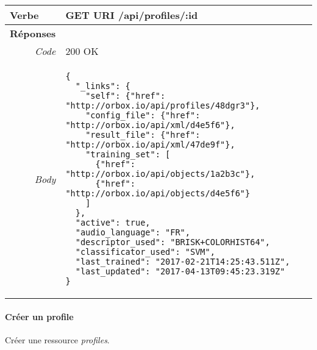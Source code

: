 \begin{appendices}
\begin{absolutelynopagebreak}
\begin{tabular}{@{}p{2cm}p{11.5cm}@{}}
    \toprule
    \textbf{Verbe}                        & GET \hspace{2.5cm} \textbf{URI} \hspace{0.25cm} /api/profiles/:id   \\ \midrule
    \textbf{Réponses}                     &        \\
    \multicolumn{1}{r}{\textit{Code}}   & 200 OK \\
    \multicolumn{1}{r}{\textit{Body}}   & \begin{verbatim}
{
  "_links": {
    "self": {"href": "http://orbox.io/api/profiles/48dgr3"},
    "config_file": {"href": "http://orbox.io/api/xml/d4e5f6"},
    "result_file": {"href": "http://orbox.io/api/xml/47de9f"},
    "training_set": [
      {"href": "http://orbox.io/api/objects/1a2b3c"},
      {"href": "http://orbox.io/api/objects/d4e5f6"}
    ]
  },
  "active": true,
  "audio_language": "FR",
  "descriptor_used": "BRISK+COLORHIST64",
  "classificator_used": "SVM",
  "last_trained": "2017-02-21T14:25:43.511Z",
  "last_updated": "2017-04-13T09:45:23.319Z"
}
    \end{verbatim}
    \label{jsonHalProfiles}
    \\ \bottomrule
\end{tabular}
\end{absolutelynopagebreak}

\begin{absolutelynopagebreak}
\paragraph{Créer un profile}
Créer une ressource \emph{profiles}.


\end{absolutelynopagebreak}
\end{appendices}

